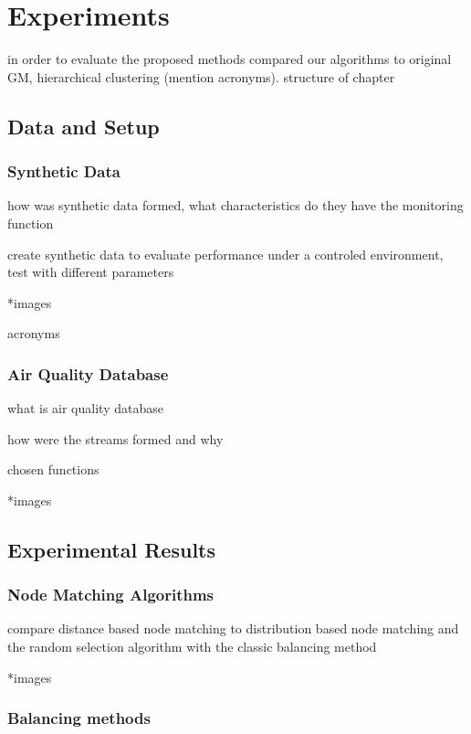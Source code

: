 \chapter{Experiments} \label{chap:exp}

in order to evaluate the proposed methods compared our algorithms to original GM, hierarchical clustering (mention acronyms). structure of chapter

\section{Data and Setup}


\subsection{Synthetic Data}

how was synthetic data formed, what characteristics do they have
the monitoring function

create synthetic data to evaluate performance under a controled environment, test with different parameters

*images

acronyms

\subsection{Air Quality Database}

what is air quality database

how were the streams formed and why

chosen functions

*images

\section{Experimental Results}

\subsection{Node Matching Algorithms}

compare distance based node matching to distribution based node matching and the random selection algorithm with the classic balancing method

*images

\subsection{Balancing methods}

